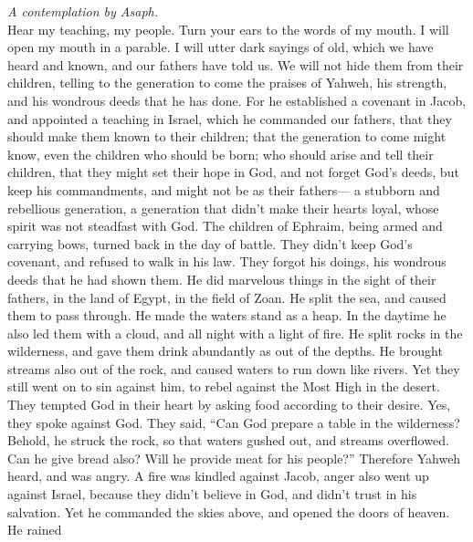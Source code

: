\emph{A contemplation by Asaph.}\\
 Hear my teaching, my people. Turn your ears to the words
of my mouth.  I will open my mouth in a parable. I will
utter dark sayings of old,  which we have heard and known,
and our fathers have told us.  We will not hide them from
their children, telling to the generation to come the praises of Yahweh,
his strength, and his wondrous deeds that he has done. 
For he established a covenant in Jacob, and appointed a teaching in
Israel, which he commanded our fathers, that they should make them known
to their children;  that the generation to come might
know, even the children who should be born; who should arise and tell
their children,  that they might set their hope in God,
and not forget God's deeds, but keep his commandments, 
and might not be as their fathers--- a stubborn and rebellious
generation, a generation that didn't make their hearts loyal, whose
spirit was not steadfast with God.  The children of
Ephraim, being armed and carrying bows, turned back in the day of
battle.  They didn't keep God's covenant, and refused to
walk in his law.  They forgot his doings, his wondrous
deeds that he had shown them.  He did marvelous things in
the sight of their fathers, in the land of Egypt, in the field of Zoan.
 He split the sea, and caused them to pass through. He
made the waters stand as a heap.  In the daytime he also
led them with a cloud, and all night with a light of fire.
 He split rocks in the wilderness, and gave them drink
abundantly as out of the depths.  He brought streams also
out of the rock, and caused waters to run down like rivers.
 Yet they still went on to sin against him, to rebel
against the Most High in the desert.  They tempted God in
their heart by asking food according to their desire. 
Yes, they spoke against God. They said, ``Can God prepare a table in the
wilderness?  Behold, he struck the rock, so that waters
gushed out, and streams overflowed. Can he give bread also? Will he
provide meat for his people?''  Therefore Yahweh heard,
and was angry. A fire was kindled against Jacob, anger also went up
against Israel,  because they didn't believe in God, and
didn't trust in his salvation.  Yet he commanded the
skies above, and opened the doors of heaven.  He rained
